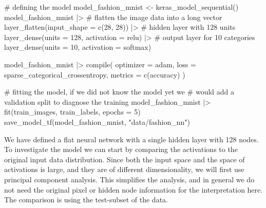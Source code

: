 \documentclass[
  letterpaper,
]{krantz}
\newenvironment{Shaded}{\begin{snugshade}}{\end{snugshade}}
\newcommand{\AttributeTok}[1]{\textcolor[rgb]{0.40,0.45,0.13}{#1}}
\newcommand{\CommentTok}[1]{\textcolor[rgb]{0.37,0.37,0.37}{#1}}
\newcommand{\DecValTok}[1]{\textcolor[rgb]{0.68,0.00,0.00}{#1}}
\newcommand{\FunctionTok}[1]{\textcolor[rgb]{0.28,0.35,0.67}{#1}}
\newcommand{\NormalTok}[1]{\textcolor[rgb]{0.00,0.23,0.31}{#1}}
\newcommand{\OtherTok}[1]{\textcolor[rgb]{0.00,0.23,0.31}{#1}}
\newcommand{\SpecialCharTok}[1]{\textcolor[rgb]{0.37,0.37,0.37}{#1}}
\newcommand{\StringTok}[1]{\textcolor[rgb]{0.13,0.47,0.30}{#1}}
\begin{document}
\begin{Shaded}
\begin{Highlighting}[]
\CommentTok{\# defining the model}
\NormalTok{model\_fashion\_mnist }\OtherTok{\textless{}{-}} \FunctionTok{keras\_model\_sequential}\NormalTok{()}
\NormalTok{model\_fashion\_mnist }\SpecialCharTok{|\textgreater{}}
  \CommentTok{\# flatten the image data into a long vector}
  \FunctionTok{layer\_flatten}\NormalTok{(}\AttributeTok{input\_shape =} \FunctionTok{c}\NormalTok{(}\DecValTok{28}\NormalTok{, }\DecValTok{28}\NormalTok{)) }\SpecialCharTok{|\textgreater{}}
  \CommentTok{\# hidden layer with 128 units}
  \FunctionTok{layer\_dense}\NormalTok{(}\AttributeTok{units =} \DecValTok{128}\NormalTok{, }\AttributeTok{activation =} \StringTok{\textquotesingle{}relu\textquotesingle{}}\NormalTok{) }\SpecialCharTok{|\textgreater{}}
  \CommentTok{\# output layer for 10 categories}
  \FunctionTok{layer\_dense}\NormalTok{(}\AttributeTok{units =} \DecValTok{10}\NormalTok{, }\AttributeTok{activation =} \StringTok{\textquotesingle{}softmax\textquotesingle{}}\NormalTok{)}

\NormalTok{model\_fashion\_mnist }\SpecialCharTok{|\textgreater{}} \FunctionTok{compile}\NormalTok{(}
  \AttributeTok{optimizer =} \StringTok{\textquotesingle{}adam\textquotesingle{}}\NormalTok{,}
  \AttributeTok{loss =} \StringTok{\textquotesingle{}sparse\_categorical\_crossentropy\textquotesingle{}}\NormalTok{,}
  \AttributeTok{metrics =} \FunctionTok{c}\NormalTok{(}\StringTok{\textquotesingle{}accuracy\textquotesingle{}}\NormalTok{)}
\NormalTok{)}

\CommentTok{\# fitting the model, if we did not know the model yet we}
\CommentTok{\# would add a validation split to diagnose the training}
\NormalTok{model\_fashion\_mnist }\SpecialCharTok{|\textgreater{}} \FunctionTok{fit}\NormalTok{(train\_images,}
\NormalTok{              train\_labels,}
              \AttributeTok{epochs =} \DecValTok{5}\NormalTok{)}
\FunctionTok{save\_model\_tf}\NormalTok{(model\_fashion\_mnist, }\StringTok{"data/fashion\_nn"}\NormalTok{)}
\end{Highlighting}
\end{Shaded}

We have defined a flat neural network with a single hidden layer with
128 nodes. To investigate the model we can start by comparing the
activations to the original input data distribution. Since both the
input space and the space of activations is large, and they are of
different dimensionality, we will first use principal component
analysis. This simplifies the analysis, and in general we do not need
the original pixel or hidden node information for the interpretation
here. The comparison is using the test-subset of the data.
\end{document}
